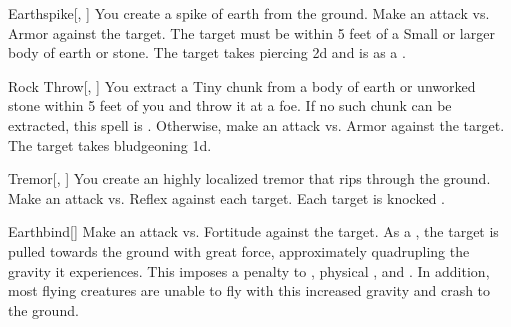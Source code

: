 \lowercase{\hypertarget{spell:Earthspike}{}}\label{spell:Earthspike}
\begin{freeability}[\nth{1}]{\hypertarget{spell:Earthspike}{Earthspike}}[, ]
You create a spike of earth from the ground.
Make an attack vs. Armor against the target.
The target must be within 5 feet of a Small or larger body of earth or stone.
\hit The target takes piercing  \minus2d and is  as a .
\end{freeability}
\vspace{0.25em}



\lowercase{\hypertarget{spell:Rock Throw}{}}\label{spell:Rock Throw}
\begin{freeability}[\nth{1}]{\hypertarget{spell:Rock Throw}{Rock Throw}}[, ]
You extract a Tiny chunk from a body of earth or unworked stone within 5 feet of you and throw it at a foe.
If no such chunk can be extracted, this spell is .
Otherwise, make an attack vs. Armor against the target.
\hit The target takes bludgeoning  \plus1d.
\end{freeability}
\vspace{0.25em}



\lowercase{\hypertarget{spell:Tremor}{}}\label{spell:Tremor}
\begin{freeability}[\nth{1}]{\hypertarget{spell:Tremor}{Tremor}}[, ]
You create an highly localized tremor that rips through the ground.
Make an attack vs. Reflex against each target.
\hit Each target is knocked .
\end{freeability}
\vspace{0.25em}



\lowercase{\hypertarget{spell:Earthbind}{}}\label{spell:Earthbind}
\begin{freeability}[\nth{2}]{\hypertarget{spell:Earthbind}{Earthbind}}[]
Make an attack vs. Fortitude against the target.
\hit As a , the target is pulled towards the ground with great force, approximately quadrupling the gravity it experiences.
This imposes a  penalty to , physical , and .
In addition, most flying creatures are unable to fly with this increased gravity and crash to the ground.
\end{freeability}
\vspace{0.25em}



